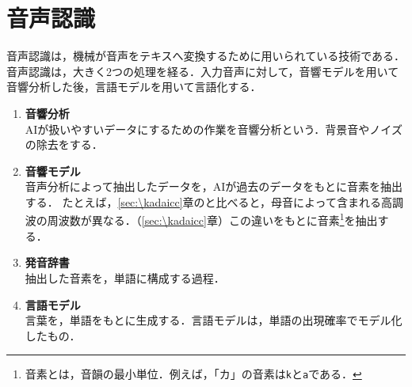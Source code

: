 \section{音声認識}
音声認識は，機械が音声をテキスへ変換するために用いられている技術である．
音声認識は，大きく2つの処理を経る．入力音声に対して，音響モデルを用いて音響分析した後，言語モデルを用いて言語化する．
\begin{enumerate}
    \item \textbf{音響分析}\\
          AIが扱いやすいデータにするための作業を音響分析という．背景音やノイズの除去をする．
    \item \textbf{音響モデル}\\
          音声分析によって抽出したデータを，AIが過去のデータをもとに音素を抽出する．
          たとえば，\ref{sec:\kadaicc}章のと比べると，母音によって含まれる高調波の周波数が異なる．（\ref{sec:\kadaicc}章）この違いをもとに音素\footnote{音素とは，音韻の最小単位．例えば，「カ」の音素は\texttt{k}と\texttt{a}である．}を抽出する．
    \item \textbf{発音辞書}\\
          抽出した音素を，単語に構成する過程．
    \item \textbf{言語モデル}\\
          言葉を，単語をもとに生成する．言語モデルは，単語の出現確率でモデル化したもの．
\end{enumerate}
\begin{flushright}
    \cite{AI音声認識とは}
\end{flushright}